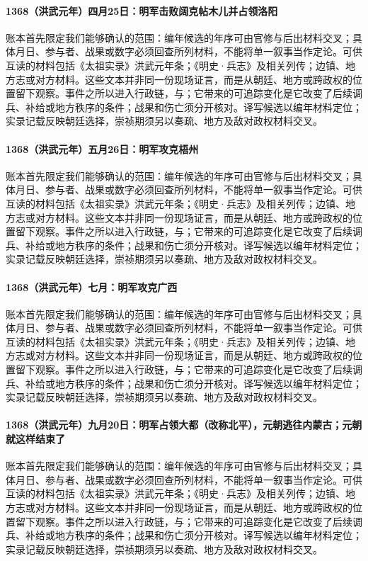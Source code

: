 \paragraph{1368（洪武元年）四月25日：明军击败阔克帖木儿并占领洛阳} 账本首先限定我们能够确认的范围：编年候选的年序可由官修与后出材料交叉；具体月日、参与者、战果或数字必须回查所列材料，不能将单一叙事当作定论。可供互读的材料包括《太祖实录》洪武元年条；《明史·兵志》及相关列传；边镇、地方志或对方材料。这些文本并非同一份现场证言，而是从朝廷、地方或跨政权的位置留下观察。事件之所以进入行政链，与；它带来的可追踪变化是它改变了后续调兵、补给或地方秩序的条件；战果和伤亡须分开核对。译写候选以编年材料定位；实录记载反映朝廷选择，崇祯期须另以奏疏、地方及敌对政权材料交叉。

\paragraph{1368（洪武元年）五月26日：明军攻克梧州} 账本首先限定我们能够确认的范围：编年候选的年序可由官修与后出材料交叉；具体月日、参与者、战果或数字必须回查所列材料，不能将单一叙事当作定论。可供互读的材料包括《太祖实录》洪武元年条；《明史·兵志》及相关列传；边镇、地方志或对方材料。这些文本并非同一份现场证言，而是从朝廷、地方或跨政权的位置留下观察。事件之所以进入行政链，与；它带来的可追踪变化是它改变了后续调兵、补给或地方秩序的条件；战果和伤亡须分开核对。译写候选以编年材料定位；实录记载反映朝廷选择，崇祯期须另以奏疏、地方及敌对政权材料交叉。

\paragraph{1368（洪武元年）七月：明军攻克广西} 账本首先限定我们能够确认的范围：编年候选的年序可由官修与后出材料交叉；具体月日、参与者、战果或数字必须回查所列材料，不能将单一叙事当作定论。可供互读的材料包括《太祖实录》洪武元年条；《明史·兵志》及相关列传；边镇、地方志或对方材料。这些文本并非同一份现场证言，而是从朝廷、地方或跨政权的位置留下观察。事件之所以进入行政链，与；它带来的可追踪变化是它改变了后续调兵、补给或地方秩序的条件；战果和伤亡须分开核对。译写候选以编年材料定位；实录记载反映朝廷选择，崇祯期须另以奏疏、地方及敌对政权材料交叉。

\paragraph{1368（洪武元年）九月20日：明军占领大都（改称北平），元朝逃往内蒙古；元朝就这样结束了} 账本首先限定我们能够确认的范围：编年候选的年序可由官修与后出材料交叉；具体月日、参与者、战果或数字必须回查所列材料，不能将单一叙事当作定论。可供互读的材料包括《太祖实录》洪武元年条；《明史·兵志》及相关列传；边镇、地方志或对方材料。这些文本并非同一份现场证言，而是从朝廷、地方或跨政权的位置留下观察。事件之所以进入行政链，与；它带来的可追踪变化是它改变了后续调兵、补给或地方秩序的条件；战果和伤亡须分开核对。译写候选以编年材料定位；实录记载反映朝廷选择，崇祯期须另以奏疏、地方及敌对政权材料交叉。

